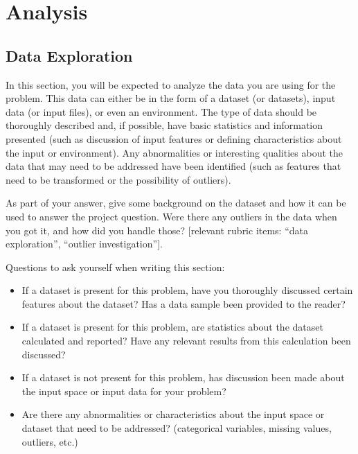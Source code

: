 \documentclass[twoside,openright,titlepage,numbers=noenddot,headinclude,%
               footinclude=true,cleardoublepage=empty,abstractoff,BCOR=5mm,%
               paper=a4,fontsize=11pt,ngerman,american]{scrreprt}
\numberwithin{theorem}{chapter}
\numberwithin{definition}{chapter}
\numberwithin{algorithm}{chapter}
\numberwithin{figure}{chapter}
\numberwithin{table}{chapter}
\numberwithin{equation}{chapter}
\begin{document}
\chapter*{Analysis}

\section*{Data Exploration}

In this section, you will be expected to analyze the data you are using for the problem. This data can either be in the form of a dataset (or datasets), input data (or input files), or even an environment. The type of data should be thoroughly described and, if possible, have basic statistics and information presented (such as discussion of input features or defining characteristics about the input or environment). Any abnormalities or interesting qualities about the data that may need to be addressed have been identified (such as features that need to be transformed or the possibility of outliers). 

As part of your answer, give some background on the dataset and how it can be used to answer the project question. Were there any outliers in the data when you got it, and how did you handle those? [relevant rubric items: ``data exploration'', ``outlier investigation'']. 

Questions to ask yourself when writing this section:

\begin{itemize}%
\item If a dataset is present for this problem, have you thoroughly discussed certain features about the dataset? Has a data sample been provided to the reader?
\item If a dataset is present for this problem, are statistics about the dataset calculated and reported? Have any relevant results from this calculation been discussed?
\item If a dataset is not present for this problem, has discussion been made about the input space or input data for your problem?
\item Are there any abnormalities or characteristics about the input space or dataset that need to be addressed? (categorical variables, missing values, outliers, etc.)
\end{itemize}
\end{document}
